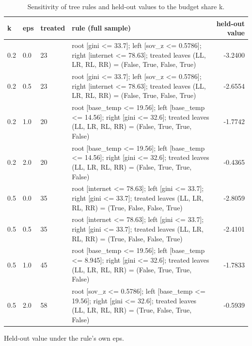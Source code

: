 \begin{table}[htbp]
\centering
\caption{Sensitivity of tree rules and held-out values to the budget share k.}
\label{tab:budget}
\begin{tabular}{lllp{7cm}r}
\toprule
k & eps & treated & rule (full sample) & held-out value \\
\midrule
0.2 & 0.0 & 23 & root [gini <= 33.7]; left [sov\_z <= 0.5786]; right [internet <= 78.63]; treated leaves (LL, LR, RL, RR) = (False, True, False, True) & -3.2400 \\
0.2 & 0.5 & 23 & root [gini <= 33.7]; left [sov\_z <= 0.5786]; right [internet <= 78.63]; treated leaves (LL, LR, RL, RR) = (False, True, False, True) & -2.6554 \\
0.2 & 1.0 & 20 & root [base\_temp <= 19.56]; left [base\_temp <= 14.56]; right [gini <= 32.6]; treated leaves (LL, LR, RL, RR) = (False, True, True, False) & -1.7742 \\
0.2 & 2.0 & 20 & root [base\_temp <= 19.56]; left [base\_temp <= 14.56]; right [gini <= 32.6]; treated leaves (LL, LR, RL, RR) = (False, True, True, False) & -0.4365 \\
0.5 & 0.0 & 35 & root [internet <= 78.63]; left [gini <= 33.7]; right [gini <= 33.7]; treated leaves (LL, LR, RL, RR) = (True, False, False, True) & -2.8059 \\
0.5 & 0.5 & 35 & root [internet <= 78.63]; left [gini <= 33.7]; right [gini <= 33.7]; treated leaves (LL, LR, RL, RR) = (True, False, False, True) & -2.4101 \\
0.5 & 1.0 & 45 & root [base\_temp <= 19.56]; left [base\_temp <= 8.945]; right [gini <= 32.6]; treated leaves (LL, LR, RL, RR) = (False, True, True, False) & -1.7833 \\
0.5 & 2.0 & 58 & root [sov\_z <= 0.5786]; left [base\_temp <= 19.56]; right [gini <= 32.6]; treated leaves (LL, LR, RL, RR) = (True, False, True, False) & -0.5939 \\
\bottomrule
\end{tabular}
\par\smallskip\footnotesize Held-out value under the rule's own eps.
\end{table}
